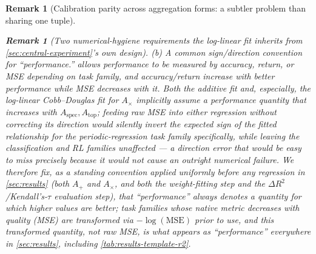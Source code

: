 \documentclass[11pt]{article}
\newtheorem{remark}[theorem]{Remark}
\newcommand{\Aspec}{A_{\mathrm{spec}}}
\newcommand{\Atop}{A_{\mathrm{top}}}
\begin{document}
\begin{remark}[Calibration parity across aggregation forms: a subtler problem than sharing one tuple]
\begin{remark}[Two numerical-hygiene requirements the log-linear fit inherits from \cref{sec:central-experiment}'s own design]
\emph{(b) A common sign/direction convention for ``performance.''}  allows performance to be measured by accuracy, return, or MSE depending on task family, and accuracy/return increase with better performance while MSE decreases with it. Both the additive fit and, especially, the log-linear Cobb--Douglas fit for $A_\times$ implicitly assume a performance quantity that increases with $\Aspec,\Atop$; feeding raw MSE into either regression without correcting its direction would silently invert the expected sign of the fitted relationship for the periodic-regression task family specifically, while leaving the classification and RL families unaffected --- a direction error that would be easy to miss precisely because it would not cause an outright numerical failure. We therefore fix, as a standing convention applied uniformly before \emph{any} regression in \cref{sec:results} (both $A_+$ and $A_\times$, and both the weight-fitting step and the $\Delta R^2$/Kendall's-$\tau$ evaluation step), that ``performance'' always denotes a quantity for which higher values are better; task families whose native metric decreases with quality (MSE) are transformed via $-\log(\mathrm{MSE})$ prior to use, and this transformed quantity, not raw MSE, is what appears as ``performance'' everywhere in \cref{sec:results}, including \cref{tab:results-template-r2}.
\end{remark}


\end{remark}
\end{document}
